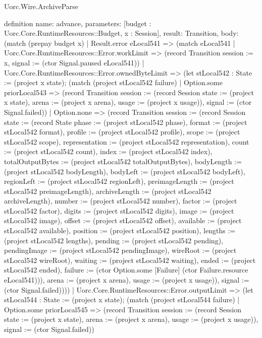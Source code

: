 \begin{lexlean}{Uorc.Wire.ArchiveParse}
\begin{semanticmodule}
definition{
  name: advance,
  parameters: [budget : Uorc.Core.RuntimeResources::Budget, x : Session],
  result: Transition,
  body: (match (prepay budget x)
    | Result.error eLocal541 => (match eLocal541
      | Uorc.Core.RuntimeResources::Error.workLimit => (record Transition {session := x, signal := (ctor Signal.paused eLocal541)})
      | Uorc.Core.RuntimeResources::Error.ownedByteLimit => (let stLocal542 : State := (project x state); (match (project stLocal542 failure)
        | Option.some priorLocal543 => (record Transition {session := (record Session {state := (project x state), arena := (project x arena), usage := (project x usage)}), signal := (ctor Signal.failed)})
        | Option.none => (record Transition {session := (record Session {state := (record State {phase := (project stLocal542 phase), format := (project stLocal542 format), profile := (project stLocal542 profile), scope := (project stLocal542 scope), representation := (project stLocal542 representation), count := (project stLocal542 count), index := (project stLocal542 index), totalOutputBytes := (project stLocal542 totalOutputBytes), bodyLength := (project stLocal542 bodyLength), bodyLeft := (project stLocal542 bodyLeft), regionLeft := (project stLocal542 regionLeft), preimageLength := (project stLocal542 preimageLength), archiveLength := (project stLocal542 archiveLength), number := (project stLocal542 number), factor := (project stLocal542 factor), digits := (project stLocal542 digits), image := (project stLocal542 image), offset := (project stLocal542 offset), available := (project stLocal542 available), position := (project stLocal542 position), lengths := (project stLocal542 lengths), pending := (project stLocal542 pending), pendingImage := (project stLocal542 pendingImage), wireRoot := (project stLocal542 wireRoot), waiting := (project stLocal542 waiting), ended := (project stLocal542 ended), failure := (ctor Option.some [Failure] (ctor Failure.resource eLocal541))}), arena := (project x arena), usage := (project x usage)}), signal := (ctor Signal.failed)})))
      | Uorc.Core.RuntimeResources::Error.outputLimit => (let stLocal544 : State := (project x state); (match (project stLocal544 failure)
        | Option.some priorLocal545 => (record Transition {session := (record Session {state := (project x state), arena := (project x arena), usage := (project x usage)}), signal := (ctor Signal.failed)})
}
\end{semanticmodule}
\end{lexlean}

